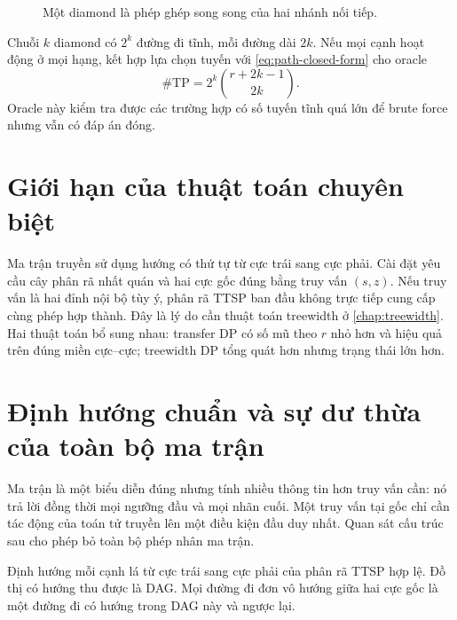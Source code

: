 \begin{figure}[htbp]
\centering
{}
\caption{Một diamond là phép ghép song song của hai nhánh nối tiếp.}
\label{fig:diamond}
\end{figure}

Chuỗi $k$ diamond có $2^k$ đường đi tĩnh, mỗi đường dài $2k$. Nếu mọi cạnh hoạt động ở mọi hạng, kết hợp lựa chọn tuyến với \cref{eq:path-closed-form} cho oracle
\begin{equation}
\label{eq:diamond-closed-form}
  \#\mathrm{TP}=2^k\binom{r+2k-1}{2k}.
\end{equation}
Oracle này kiểm tra được các trường hợp có số tuyến tĩnh quá lớn để brute force nhưng vẫn có đáp án đóng.

\section{Giới hạn của thuật toán chuyên biệt}

Ma trận truyền sử dụng hướng có thứ tự từ cực trái sang cực phải. Cài đặt yêu cầu cây phân rã nhất quán và hai cực gốc đúng bằng truy vấn $(s,z)$. Nếu truy vấn là hai đỉnh nội bộ tùy ý, phân rã TTSP ban đầu không trực tiếp cung cấp cùng phép hợp thành. Đây là lý do cần thuật toán treewidth ở \cref{chap:treewidth}. Hai thuật toán bổ sung nhau: transfer DP có số mũ theo $r$ nhỏ hơn và hiệu quả trên đúng miền cực--cực; treewidth DP tổng quát hơn nhưng trạng thái lớn hơn.

\section{Định hướng chuẩn và sự dư thừa của toàn bộ ma trận}

Ma trận là một biểu diễn đúng nhưng tính nhiều thông tin hơn truy vấn cần: nó trả lời đồng thời mọi ngưỡng đầu và mọi nhãn cuối. Một truy vấn tại gốc chỉ cần tác động của toán tử truyền lên một điều kiện đầu duy nhất. Quan sát cấu trúc sau cho phép bỏ toàn bộ phép nhân ma trận.

\begin{lemma}
\label{lem:ttsp-orientation}
Định hướng mỗi cạnh lá từ cực trái sang cực phải của phân rã TTSP hợp lệ. Đồ thị có hướng thu được là DAG. Mọi đường đi đơn vô hướng giữa hai cực gốc là một đường đi có hướng trong DAG này và ngược lại.
\end{lemma}

